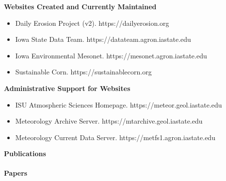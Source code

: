 \documentclass[11pt]{article}
\begin{document}
%
\Large \bf Websites Created and Currently Maintained
\normalsize \sf
\begin{itemize}
\item Daily Erosion Project (v2). https://dailyerosion.org
\item Iowa State Data Team. https://datateam.agron.iastate.edu
\item Iowa Environmental Mesonet. https://mesonet.agron.iastate.edu
\item Sustainable Corn. https://sustainablecorn.org
\end{itemize}
\Large \bf Administrative Support for Websites
\normalsize \sf
\begin{itemize}
\item ISU Atmospheric Sciences Homepage. https://meteor.geol.iastate.edu
\item Meteorology Archive Server. https://mtarchive.geol.iastate.edu
\item Meteorology Current Data Server. https://metfs1.agron.iastate.edu
\end{itemize}
%
\Large \bf Publications\\ \\
\normalsize \bf Papers
\normalsize \sf
\end{document}
